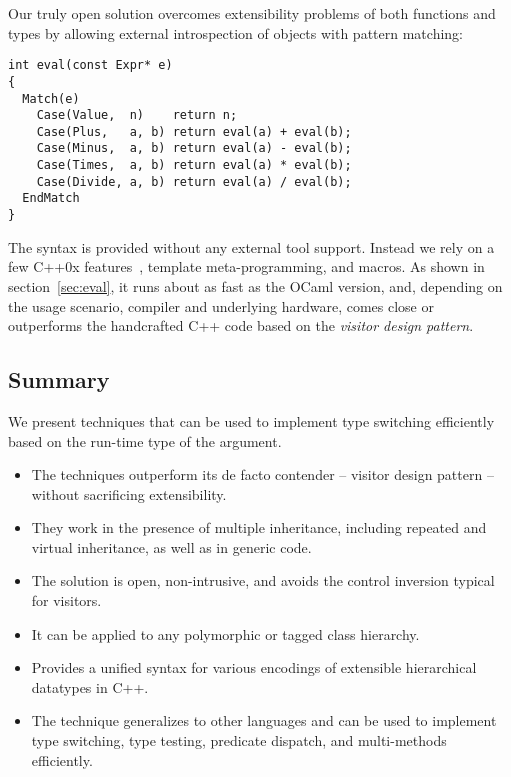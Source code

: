 Our truly open solution overcomes extensibility problems of both functions and 
types by allowing external introspection of objects with pattern matching:

\begin{lstlisting}[keepspaces,columns=flexible]
int eval(const Expr* e)
{
  Match(e)
    Case(Value,  n)    return n;
    Case(Plus,   a, b) return eval(a) + eval(b);
    Case(Minus,  a, b) return eval(a) - eval(b);
    Case(Times,  a, b) return eval(a) * eval(b);
    Case(Divide, a, b) return eval(a) / eval(b);
  EndMatch
}
\end{lstlisting}

\noindent
The syntax is provided without any external tool support. Instead we rely on a 
few C++0x features~\cite{C++0x}, template meta-programming, and macros. As shown 
in section~\ref{sec:eval}, it runs about as fast as the OCaml version, and, 
depending on the usage scenario, compiler and underlying hardware, comes close 
or outperforms the handcrafted C++ code based on the \emph{visitor design pattern}.

\subsection{Summary}

We present techniques that can be used to implement type switching efficiently 
based on the run-time type of the argument.

  \begin{itemize}
  \setlength{\itemsep}{0pt}
  \setlength{\parskip}{0pt}
  \item The techniques outperform its de facto contender -- visitor design 
        pattern -- without sacrificing extensibility.
  \item They work in the presence of multiple inheritance, including repeated and 
        virtual inheritance, as well as in generic code.
  \item The solution is open, non-intrusive, and avoids the control inversion 
        typical for visitors. 
  \item It can be applied to any polymorphic or tagged class hierarchy.
  \item Provides a unified syntax for various encodings of extensible 
        hierarchical datatypes in C++.
  \item The technique generalizes to other languages and can be used to 
        implement type switching, type testing, predicate dispatch, and 
        multi-methods efficiently.
  \end{itemize}

